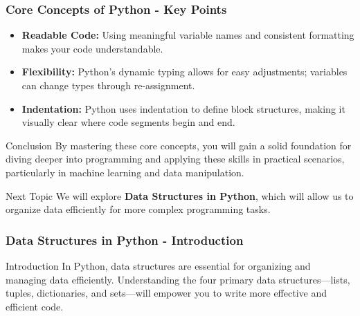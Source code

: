 \documentclass{beamer}
\begin{document}
\begin{frame}
    \frametitle{Core Concepts of Python - Key Points}
    \begin{itemize}
        \item \textbf{Readable Code:} Using meaningful variable names and consistent formatting makes your code understandable.
        \item \textbf{Flexibility:} Python's dynamic typing allows for easy adjustments; variables can change types through re-assignment.
        \item \textbf{Indentation:} Python uses indentation to define block structures, making it visually clear where code segments begin and end.
    \end{itemize}

    \begin{block}{Conclusion}
        By mastering these core concepts, you will gain a solid foundation for diving deeper into programming
        and applying these skills in practical scenarios, particularly in machine learning and data manipulation.
    \end{block}

    \begin{block}{Next Topic}
        We will explore \textbf{Data Structures in Python}, which will allow us to organize data efficiently for more complex programming tasks.
    \end{block}
\end{frame}

\begin{frame}[fragile]
    \frametitle{Data Structures in Python - Introduction}
    \begin{block}{Introduction}
        In Python, data structures are essential for organizing and managing data efficiently. 
        Understanding the four primary data structures—lists, tuples, dictionaries, and sets—will empower you to write more effective and efficient code.
    \end{block}
\end{frame}
\end{document}
